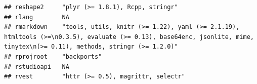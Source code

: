 \documentclass[]{article}
\begin{document}
\begin{verbatim}
## reshape2     "plyr (>= 1.8.1), Rcpp, stringr"                                                                                                                                                                                                                                                                                                                                                                                                                                                      
## rlang        NA                                                                                                                                                                                                                                                                                                                                                                                                                                                                                    
## rmarkdown    "tools, utils, knitr (>= 1.22), yaml (>= 2.1.19), htmltools (>=\n0.3.5), evaluate (>= 0.13), base64enc, jsonlite, mime, tinytex\n(>= 0.11), methods, stringr (>= 1.2.0)"                                                                                                                                                                                                                                                                                                              
## rprojroot    "backports"                                                                                                                                                                                                                                                                                                                                                                                                                                                                           
## rstudioapi   NA                                                                                                                                                                                                                                                                                                                                                                                                                                                                                    
## rvest        "httr (>= 0.5), magrittr, selectr"                                                                                                                                                                                                                                                                                                                                                                                                                                                    

\end{verbatim}
\end{document}
